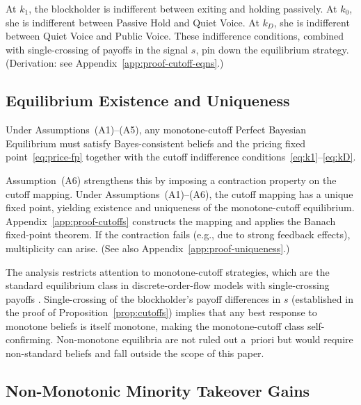 At $k_1$, the blockholder is indifferent between exiting and holding passively. At $k_0$, she is indifferent between Passive Hold and Quiet Voice. At $k_D$, she is indifferent between Quiet Voice and Public Voice. These indifference conditions, combined with single-crossing of payoffs in the signal $s$, pin down the equilibrium strategy. (Derivation: see Appendix~\ref{app:proof-cutoff-eqns}.)

\subsection{Equilibrium Existence and Uniqueness}

Under Assumptions~\textup{(A1)}--\textup{(A5)}, any monotone-cutoff Perfect Bayesian Equilibrium must satisfy Bayes-consistent beliefs and the pricing fixed point~\eqref{eq:price-fp} together with the cutoff indifference conditions~\eqref{eq:k1}--\eqref{eq:kD}.

Assumption~\textup{(A6)} strengthens this by imposing a contraction property on the cutoff mapping. Under Assumptions~\textup{(A1)}--\textup{(A6)}, the cutoff mapping has a unique fixed point, yielding existence and uniqueness of the monotone-cutoff equilibrium. Appendix~\ref{app:proof-cutoffs} constructs the mapping and applies the Banach fixed-point theorem. If the contraction fails (e.g., due to strong feedback effects), multiplicity can arise. (See also Appendix~\ref{app:proof-uniqueness}.)

The analysis restricts attention to monotone-cutoff strategies, which are the standard equilibrium class in discrete-order-flow models with single-crossing payoffs \citep{EdmansGoldsteinJiang2015,EdmansGoldsteinJiang2012}. Single-crossing of the blockholder's payoff differences in $s$ (established in the proof of Proposition~\ref{prop:cutoffs}) implies that any best response to monotone beliefs is itself monotone, making the monotone-cutoff class self-confirming. Non-monotone equilibria are not ruled out a~priori but would require non-standard beliefs and fall outside the scope of this paper.

\subsection{Non-Monotonic Minority Takeover Gains}

